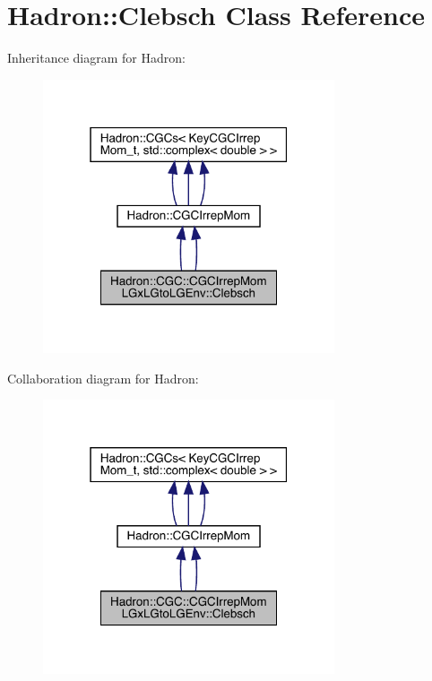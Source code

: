 \hypertarget{classHadron_1_1CGC_1_1CGCIrrepMomLGxLGtoLGEnv_1_1Clebsch}{}\section{Hadron\+:\+:Clebsch Class Reference}
\label{classHadron_1_1CGC_1_1CGCIrrepMomLGxLGtoLGEnv_1_1Clebsch}


Inheritance diagram for Hadron\+:
\nopagebreak
\begin{figure}[H]
\begin{center}
\leavevmode
\includegraphics[width=244pt]{d5/d91/classHadron_1_1CGC_1_1CGCIrrepMomLGxLGtoLGEnv_1_1Clebsch__inherit__graph}
\end{center}
\end{figure}


Collaboration diagram for Hadron\+:
\nopagebreak
\begin{figure}[H]
\begin{center}
\leavevmode
\includegraphics[width=244pt]{d2/dbd/classHadron_1_1CGC_1_1CGCIrrepMomLGxLGtoLGEnv_1_1Clebsch__coll__graph}
\end{center}
\end{figure}
